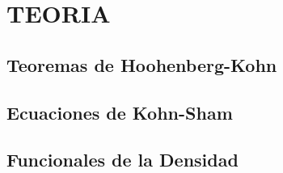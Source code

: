 \chapter{TEORIA}

 





\section{Teoremas de Hoohenberg-Kohn}   

\section{Ecuaciones de Kohn-Sham}

\section{Funcionales de la Densidad}

